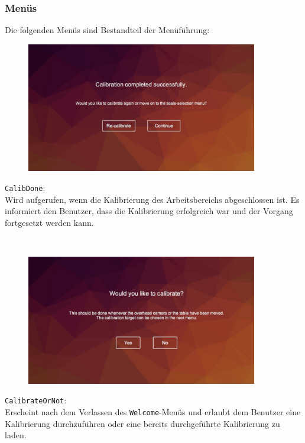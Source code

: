 \subsubsection{Menüs}\label{sec:menus}
Die folgenden Menüs sind Bestandteil der Menüführung:

\begin{minipage}{0.6\textwidth}
	\begin{figure}[H] 
		\includegraphics[trim=3cm 2cm 3cm 2cm, clip, width=0.9\textwidth]{Bilder/CalibDone.jpg}
			\label{fig:CalibDone}
	\end{figure}
\end{minipage}
\begin{minipage}{0.4\textwidth}
	\texttt{CalibDone}:\\
	Wird aufgerufen, wenn die Kalibrierung des Arbeitsbereichs abgeschlossen ist. Es informiert den Benutzer, dass die Kalibrierung erfolgreich war und der Vorgang fortgesetzt werden kann.
\end{minipage}\\

\begin{minipage}{0.6\textwidth}
	\begin{figure}[H] 
		\includegraphics[trim=3cm 2cm 2cm 2cm, clip, width=0.9\textwidth]{Bilder/CalibrateOrNot.jpg}
			\label{fig:CalibrateOrNot}
	\end{figure}
\end{minipage}
\begin{minipage}{0.4\textwidth}
	\texttt{CalibrateOrNot}:\\
	Erscheint nach dem Verlassen des \texttt{Welcome}-Menüs und erlaubt dem Benutzer eine Kalibrierung durchzuführen oder eine bereits durchgeführte Kalibrierung zu laden.
\end{minipage}\\

